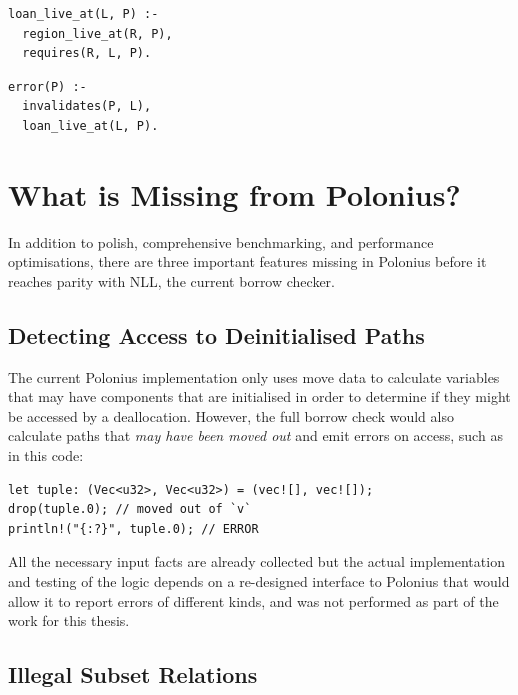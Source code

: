 \documentclass[11pt,a4paper,twoside,openany]{report}
\newenvironment{sourcecode}{\captionsetup{type=listing}}{}
\begin{document}
\begin{sourcecode}
  \label{lst:loan-live}
\begin{verbatim}
loan_live_at(L, P) :-
  region_live_at(R, P),
  requires(R, L, P).
\end{verbatim}
\end{sourcecode}

\begin{sourcecode}
  \label{lst:error-invalidates}
\begin{verbatim}
error(P) :-
  invalidates(P, L),
  loan_live_at(L, P).
\end{verbatim}
\end{sourcecode}

\section{What is Missing from Polonius?}\label{sec:missing-features}

In addition to polish, comprehensive benchmarking, and performance
optimisations, there are three important features missing in Polonius before it
reaches parity with NLL, the current borrow checker.

\subsection{Detecting Access to Deinitialised Paths}
\label{sec:missing-features:move}

The current Polonius implementation only uses move data to calculate variables
that may have components that are initialised in order to determine if they
might be accessed by a deallocation. However, the full borrow check would also
calculate paths that \emph{may have been moved out} and emit errors on access,
such as in this code:
\begin{verbatim}
let tuple: (Vec<u32>, Vec<u32>) = (vec![], vec![]);
drop(tuple.0); // moved out of `v`
println!("{:?}", tuple.0); // ERROR
\end{verbatim}

All the necessary input facts are already collected but the actual
implementation and testing of the logic depends on a re-designed interface to
Polonius that would allow it to report errors of different kinds, and was not
performed as part of the work for this thesis.

\subsection{Illegal Subset Relations}
\label{sec:missing-features:illegal-subset-relations}
\end{document}
